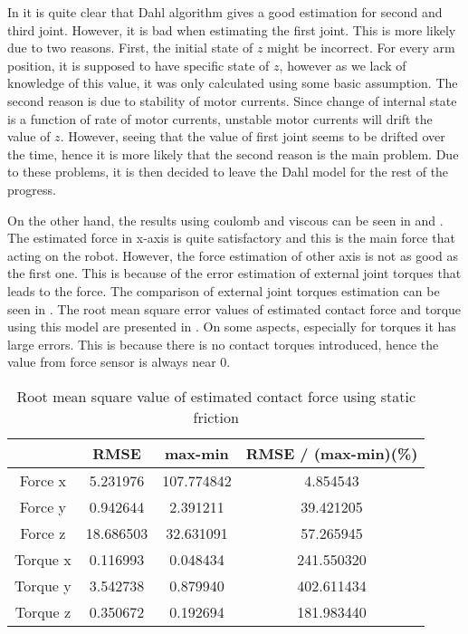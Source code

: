 In  it is quite clear that Dahl algorithm gives a good estimation for second and third joint. However, it is bad when estimating the first joint. This is more likely due to two reasons. First, the initial state of $z$ might be incorrect. For every arm position, it is supposed to have specific state of $z$, however as we lack of knowledge of this value, it was only calculated using some basic assumption. The second reason is due to stability of motor currents. Since change of internal state is a function of rate of motor currents, unstable motor currents will drift the value of $z$. However, seeing that the value of first joint seems to be drifted over the time, hence it is more likely that the second reason is the main problem. Due to these problems, it is then decided to leave the Dahl model for the rest of the progress.

On the other hand, the results using coulomb and viscous can be seen in  and . The estimated force in x-axis is quite satisfactory and this is the main force that acting on the robot. However, the force estimation of other axis is not as good as the first one. This is because of the error estimation of external joint torques that leads to the force. The comparison of external joint torques estimation can be seen in . The root mean square error values of estimated contact force and torque using this model are presented in . On some aspects, especially for torques it has large errors. This is because there is no contact torques introduced, hence the value from force sensor is always near 0.

\begin{table}[H]
    \centering
    \begin{tabular}{| c | c | c | c |}
    \hline
              & RMSE & max-min & RMSE / (max-min)(\%) \\ \hline
    Force x   & 5.231976  & 107.774842  & 4.854543  \\ \hline
    Force y   & 0.942644  & 2.391211    & 39.421205  \\ \hline
    Force z   & 18.686503 & 32.631091   & 57.265945  \\ \hline
    Torque x  & 0.116993  & 0.048434    & 241.550320  \\ \hline
    Torque y  & 3.542738  & 0.879940    & 402.611434  \\ \hline
    Torque z  & 0.350672  & 0.192694    & 181.983440  \\ \hline
    \end{tabular}
    \caption{Root mean square value of estimated contact force using static friction}
    \label{table:rmse}
\end{table}

